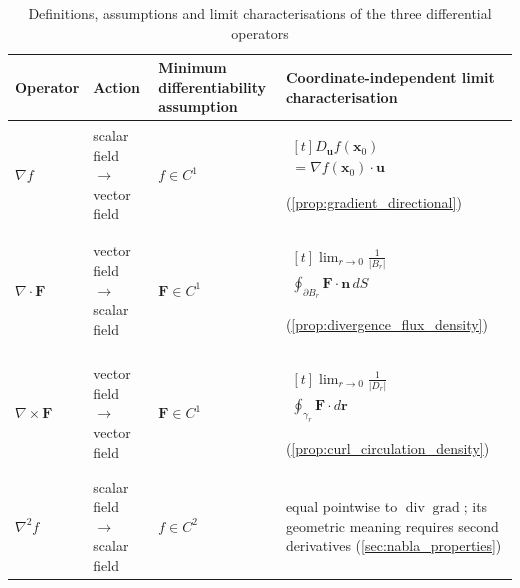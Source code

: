 \begin{table}[htbp]
    \centering
    \caption{Definitions, assumptions and limit characterisations of the three differential operators}
    \label{tab:operators_summary}
    \renewcommand{\arraystretch}{1.05}
    \setlength{\tabcolsep}{3pt}
    \begin{tabularx}{\textwidth}{@{}>{\raggedright\arraybackslash}p{1.9cm} >{\raggedright\arraybackslash}p{1.8cm} >{\raggedright\arraybackslash}p{2.1cm} >{\raggedright\arraybackslash}X@{}}
        \toprule
        \textbf{Operator} & \textbf{Action} & \textbf{Minimum differentiability assumption} & \textbf{Coordinate-\allowbreak independent limit characterisation} \\
        \midrule
        $\nabla f$ & scalar field $\to$ vector field & $f\in C^1$ & $\begin{aligned}[t]D_{\mathbf u}f(\mathbf x_0)\\[-2pt]{}=\nabla f(\mathbf x_0)\cdot\mathbf u\end{aligned}$\par (\cref{prop:gradient_directional})\\
        $\nabla\cdot\mathbf F$ & vector field $\to$ scalar field & $\mathbf F\in C^1$ & $\begin{aligned}[t]\lim_{r\to0}\frac{1}{|B_r|}\\[-2pt]\oint_{\partial B_r}\mathbf F\cdot\mathbf n\,dS\end{aligned}$\par (\cref{prop:divergence_flux_density})\\
        $\nabla\times\mathbf F$ & vector field $\to$ vector field & $\mathbf F\in C^1$ & $\begin{aligned}[t]\lim_{r\to0}\frac{1}{|D_r|}\\[-2pt]\oint_{\gamma_r}\mathbf F\cdot d\mathbf r\end{aligned}$\par (\cref{prop:curl_circulation_density})\\
        $\nabla^2 f$ & scalar field $\to$ scalar field & $f\in C^2$ & equal pointwise to $\operatorname{div}\operatorname{grad}$; its geometric meaning requires second derivatives (\cref{sec:nabla_properties})\\
        \bottomrule
    \end{tabularx}
\end{table}

